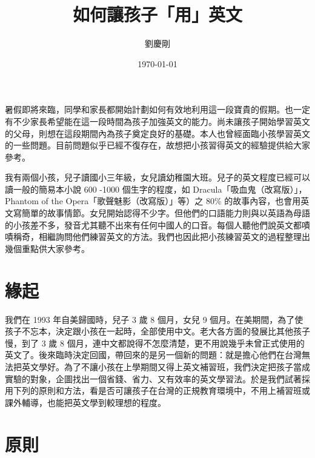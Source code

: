 
\title{ {\MB 如何讓孩子「用」英文}}	%
\author{{\SM 劉慶剛}}				%
\date{{\TT \today }} 			

\maketitle
\fontsize{12}{22pt}\selectfont 

暑假即將來臨，同學和家長都開始計劃如何有效地利用這一段寶貴的假期。也一定有不少家長希望能在這一段時間為孩子加強英文的能力。尚未讓孩子開始學習英文的父母，則想在這段期間內為孩子奠定良好的基礎。本人也曾經面臨小孩學習英文的一些問題。目前問題似乎已經不復存在，故想把小孩習得英文的經驗提供給大家參考。

我有兩個小孩，兒子讀國小三年級，女兒讀幼稚園大班。兒子的英文程度已經可以讀一般的簡易本小說 600 -1000 個生字的程度，如  Dracula「吸血鬼（改寫版）」，Phantom of the Opera「歌聲魅影（改寫版）」等）之 80\%  的故事內容，也會用英文寫簡單的故事情節。女兒開始認得不少字。但他們的口語能力則與以英語為母語的小孩差不多，發音尤其聽不出來有任何中國人的口音。每個人聽他們說英文都嘖嘖稱奇，相繼詢問他們練習英文的方法。我們也因此把小孩練習英文的過程整理出幾個重點供大家參考。


\section{緣起}
我們在 1993 年自美歸國時，兒子 3 歲 8 個月，女兒 9 個月。在美期間，為了使孩子不忘本，決定跟小孩在一起時，全部使用中文。老大各方面的發展比其他孩子慢，到了 3 歲 8 個月，連中文都說得不怎麼清楚，更不用說幾乎未曾正式使用的英文了。後來臨時決定回國，帶回來的是另一個新的問題：就是擔心他們在台灣無法把英文學好。為了不讓小孩在上學期間又得上英文補習班，我們決定把孩子當成實驗的對象，企圖找出一個省錢、省力、又有效率的英文學習法。於是我們試著採用下列的原則和方法，看是否可讓孩子在台灣的正規教育環境中，不用上補習班或課外輔導，也能把英文學到較理想的程度。

\section{原則}
